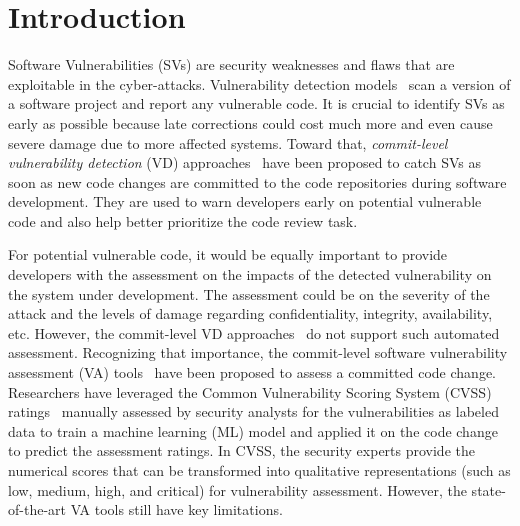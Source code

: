 \section{Introduction}
\label{intro:sec}


Software Vulnerabilities (SVs) are security weaknesses and flaws that
are exploitable in the cyber-attacks. Vulnerability detection
models~\cite{li2018vuldeepecker,zhou2019devign,li2021sysevr} scan a
version of a software project and report any vulnerable code. It is
crucial to identify SVs as early as possible because late corrections
could cost much more and even cause severe damage due to more
affected systems. Toward that, {\em commit-level vulnerability
  detection} (VD)
approaches~\cite{perl2015vccfinder,zhou2017automated,chen2019large}
have been proposed to catch SVs as soon as new code changes are
committed to the code repositories during software development. They
are used to warn developers early on potential vulnerable code and
also help better prioritize the code review task.


For potential vulnerable code, it would be equally important to
provide developers with the assessment on the impacts of the detected
vulnerability on the system under development. The assessment could be
on the severity of the attack and the levels of damage regarding
confidentiality, integrity, availability, etc. However, the
commit-level VD
approaches~\cite{perl2015vccfinder,zhou2017automated,chen2019large} do
not support such automated assessment. Recognizing that importance,
the commit-level software vulnerability assessment (VA)
tools~\cite{deepCVA-ase21} have been proposed to assess a committed
code change. Researchers have leveraged the Common Vulnerability
Scoring System (CVSS) ratings~\cite{first-website} manually assessed
by security analysts for the vulnerabilities as labeled data to train
a machine learning (ML) model and applied it on the code change to
predict the assessment ratings. In CVSS, the security experts provide
the numerical scores that can be transformed into qualitative
representations (such as low, medium, high, and critical) for
vulnerability assessment. However, the state-of-the-art VA tools still
have key limitations.

